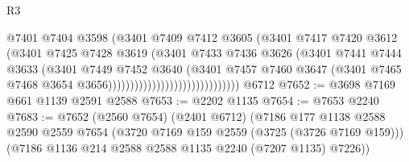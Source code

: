 \begin{lexlean}{R3}
\begin{coremodule}
                                                @7401
                                                @7404
                                                @3598
                                                (@3401
                                                  @7409
                                                  @7412
                                                  @3605
                                                  (@3401
                                                    @7417
                                                    @7420
                                                    @3612
                                                    (@3401
                                                      @7425
                                                      @7428
                                                      @3619
                                                      (@3401
                                                        @7433
                                                        @7436
                                                        @3626
                                                        (@3401
                                                          @7441
                                                          @7444
                                                          @3633
                                                          (@3401
                                                            @7449
                                                            @7452
                                                            @3640
                                                            (@3401
                                                              @7457
                                                              @7460
                                                              @3647
                                                              (@3401
                                                                @7465
                                                                @7468
                                                                @3654
                                                                @3656))))))))))))))))))))))))))))))
    @6712
@7652 := @3698 @7169 @661 @1139 @2591 @2588
@7653 := @2202 @1135
@7654 := @7653 @2240
@7683 := @7652
    (@2560 @7654)
    (@2401 @6712)
    (@7186
      @177
      @1138
      @2588
      @2590
      @2559
      @7654
      (@3720 @7169 @159 @2559 (@3725 (@3726 @7169 @159)))
      (@7186 @1136 @214 @2588 @2588 @1135 @2240 (@7207 @1135) @7226))

\end{coremodule}
\end{lexlean}
